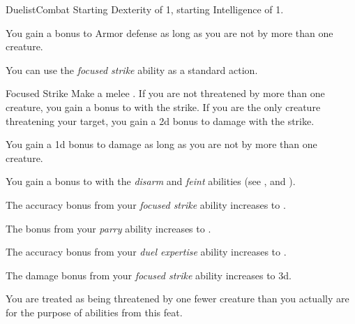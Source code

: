     \begin{feat}{Duelist}{Combat}
        \featpre Starting Dexterity of 1, starting Intelligence of 1.

         You gain a  bonus to Armor defense as long as you are not  by more than one creature.

         You can use the \textit{focused strike} ability as a standard action.
        \begin{apability}{Focused Strike}
            Make a melee .
            If you are not threatened by more than one creature, you gain a  bonus to  with the strike.
            If you are the only creature threatening your target, you gain a \plus2d bonus to damage with the strike.
        \end{apability}

         You gain a \plus1d bonus to damage as long as you are not  by more than one creature.

         You gain a  bonus to  with the \textit{disarm} and \textit{feint} abilities (see , and ).

         The accuracy bonus from your \textit{focused strike} ability increases to .

         The bonus from your \textit{parry} ability increases to .

         The accuracy bonus from your \textit{duel expertise} ability increases to .

         The damage bonus from your \textit{focused strike} ability increases to \plus3d.

         You are treated as being threatened by one fewer creature than you actually are for the purpose of abilities from this feat.
    \end{feat}

